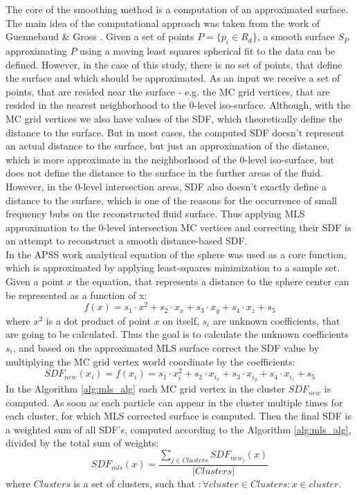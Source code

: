 The core of the smoothing method is a computation of an approximated surface. 
The main idea of the computational approach was taken from the work of Guennebaud \& Gross \cite{Apss}. 
Given a set of points $P = \{p_i \in R_d \}$, a smooth surface $S_P$ approximating $P$ using a moving least squares spherical fit to the data can be defined. However, in the case of this study, there is no set of points, that define the surface and which should be approximated. As an input we receive a set of points, that are resided near the surface - e.g. the MC grid vertices, that are resided in the nearest neighborhood to the 0-level iso-surface. 
Although, with the MC grid vertices we also have values of the SDF, which theoretically define the distance to the surface. But in most cases, the computed SDF doesn't represent an actual distance to the surface, but just an approximation of the distance, which is more approximate in the neighborhood of the 0-level iso-surface, but does not define the distance to the surface in the further areas of the fluid. 
However, in the 0-level intersection areas, SDF also doesn't exactly define a distance to the surface, which is one of the reasons for the occurrence of small frequency bubs on the reconstructed fluid surface. Thus applying MLS approximation to the 0-level intersection MC vertices and correcting their SDF is an attempt to reconstruct a smooth distance-based SDF.\\
In the APSS work analytical equation of the sphere was used as a core function, which is approximated by applying least-squares minimization to a sample set. Given a point $x$ the equation, that represents a distance to the sphere center can be represented as a function of x:
\begin{equation}
f(x) = s_1\cdot x^2 + s_2 \cdot x_x + s_3 \cdot x_y + s_4 \cdot x_z + s_5
\end{equation}
where $x^2$ is a dot product of point $x$ on itself, $s_i$ are unknown coefficients, that are going to be calculated. Thus the goal is to calculate the unknown coefficients $s_i$, and based on the approximated MLS surface correct the SDF value by multiplying the MC grid vertex world coordinate by the coefficients:
\begin{equation}
SDF_{new}(x_i) = f(x_i) = s_1\cdot x_i^2 + s_2 \cdot x_{i_x} + s_3 \cdot x_{i_y} + s_4 \cdot x_{i_z} + s_5
\end{equation}
In the Algorithm \ref{alg:mls_alg} each MC grid vertex in the cluster $SDF_{new}$ is computed. As soon as each particle can appear in the cluster multiple times for each cluster, for which MLS corrected surface is computed. Then the final SDF is a weighted sum of all SDF's, computed according to the Algorithm \ref{alg:mls_alg}, divided by the total sum of weights:
\begin{equation}
	SDF_{mls}(x) = \dfrac{\sum_{j \in Clusters}{SDF_{new_j}(x)}}{|Clusters|}
\end{equation}
where $Clusters$ is a set of clusters, such that $: \forall cluster \in Clusters: x \in cluster$. 
